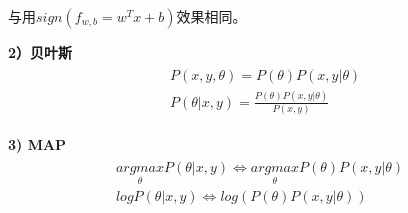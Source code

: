 \documentclass[12pt,UTF8,AutoFakeBold]{article}
\begin{document}
与用$sign({ f }_{ w,b }={ w }^{ T }x+b)$效果相同。

\textbf{2）贝叶斯}
\begin{gather}
\begin{aligned}
& P(x,y,\theta )=P(\theta )P(x,y|\theta )\\ 
& P(\theta |x,y)=\frac { P(\theta )P(x,y|\theta ) }{ P(x,y) } 
\end{aligned}
\end{gather}

\textbf{3) MAP}
\begin{gather}
\begin{aligned}
\underset { \theta  }{ argmax } P(\theta |x,y)\Leftrightarrow \underset { \theta  }{ argmax } P(\theta )P(x,y|\theta )\\ 
logP(\theta |x,y)\Leftrightarrow log(P(\theta )P(x,y|\theta ))
\end{aligned}
\end{gather}
\end{document}
